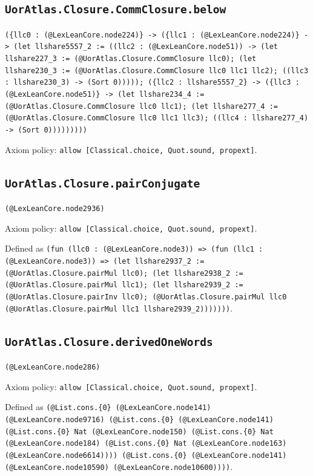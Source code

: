 \documentclass[11pt]{article}
\begin{document}
\subsection*{\texttt{UorAtlas.Closure.CommClosure.below}}
\noindent\texttt{(\{llc0 : (@LexLeanCore.node224)\} -> (\{llc1 : (@LexLeanCore.node224)\} -> (let llshare5557\_2 := ((llc2 : (@LexLeanCore.node51)) -> (let llshare227\_3 := (@UorAtlas.Closure.CommClosure llc0); (let llshare230\_3 := (@UorAtlas.Closure.CommClosure llc0 llc1 llc2); ((llc3 : llshare230\_3) -> (Sort 0))))); (\{llc2 : llshare5557\_2\} -> (\{llc3 : (@LexLeanCore.node51)\} -> (let llshare234\_4 := (@UorAtlas.Closure.CommClosure llc0 llc1); (let llshare277\_4 := (@UorAtlas.Closure.CommClosure llc0 llc1 llc3); ((llc4 : llshare277\_4) -> (Sort 0)))))))))}\par
\noindent Axiom policy: \texttt{allow [Classical.choice, Quot.sound, propext]}.\par
\subsection*{\texttt{UorAtlas.Closure.pairConjugate}}
\noindent\texttt{(@LexLeanCore.node2936)}\par
\noindent Axiom policy: \texttt{allow [Classical.choice, Quot.sound, propext]}.\par
\noindent Defined as \texttt{(fun (llc0 : (@LexLeanCore.node3)) => (fun (llc1 : (@LexLeanCore.node3)) => (let llshare2937\_2 := (@UorAtlas.Closure.pairMul llc0); (let llshare2938\_2 := (@UorAtlas.Closure.pairMul llc1); (let llshare2939\_2 := (@UorAtlas.Closure.pairInv llc0); (@UorAtlas.Closure.pairMul llc0 (@UorAtlas.Closure.pairMul llc1 llshare2939\_2)))))))}.\par
\subsection*{\texttt{UorAtlas.Closure.derivedOneWords}}
\noindent\texttt{(@LexLeanCore.node286)}\par
\noindent Axiom policy: \texttt{allow [Classical.choice, Quot.sound, propext]}.\par
\noindent Defined as \texttt{(@List.cons.\{0\} (@LexLeanCore.node141) (@LexLeanCore.node9716) (@List.cons.\{0\} (@LexLeanCore.node141) (@List.cons.\{0\} Nat (@LexLeanCore.node150) (@List.cons.\{0\} Nat (@LexLeanCore.node184) (@List.cons.\{0\} Nat (@LexLeanCore.node163) (@LexLeanCore.node6614)))) (@List.cons.\{0\} (@LexLeanCore.node141) (@LexLeanCore.node10590) (@LexLeanCore.node10600))))}.\par
\end{document}
